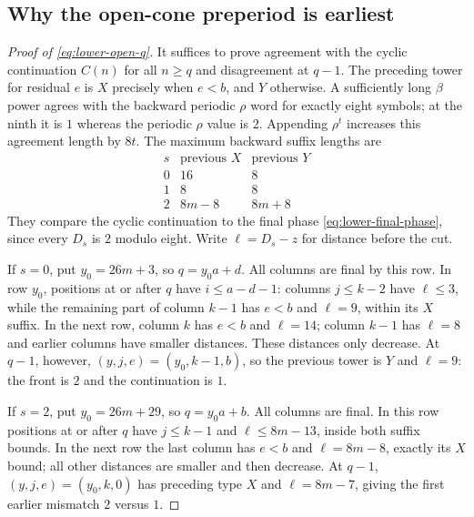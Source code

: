 \documentclass[11pt]{article}
\theoremstyle{remark}\newtheorem{remark}[theorem]{Remark}
\begin{document}
\subsection{Why the open-cone preperiod is earliest}
\begin{proof}[Proof of \eqref{eq:lower-open-q}]
It suffices to prove agreement with the cyclic continuation $C(n)$ for
all $n\ge q$ and disagreement at $q-1$. The preceding tower for residual
$e$ is $X$ precisely when $e<b$, and $Y$ otherwise.
A sufficiently long $\beta$ power agrees with the backward periodic
$\rho$ word for exactly eight symbols; at the ninth it is $1$ whereas
the periodic $\rho$ value is $2$. Appending $\rho^t$ increases this
agreement length by $8t$. The maximum backward suffix lengths are
\[
\begin{array}{c|cc}
 s&\text{previous }X&\text{previous }Y\\\hline
 0&16&8\\
 1&8&8\\
 2&8m-8&8m+8
\end{array}
\]
They compare the cyclic continuation to the final phase
\eqref{eq:lower-final-phase}, since every $D_s$ is $2$ modulo eight.
Write $\ell=D_s-z$ for distance before the cut.

If $s=0$, put $y_0=26m+3$, so $q=y_0a+d$.
All columns are final by this row. In row $y_0$, positions at or after
$q$ have $i\le a-d-1$: columns $j\le k-2$ have $\ell\le3$, while
the remaining part of column $k-1$ has $e<b$ and $\ell=9$, within its
$X$ suffix. In the next row, column $k$ has $e<b$ and $\ell=14$;
column $k-1$ has $\ell=8$ and earlier columns have smaller distances.
These distances only decrease. At $q-1$, however,
$(y,j,e)=(y_0,k-1,b)$, so the previous tower is $Y$ and $\ell=9$:
the front is $2$ and the continuation is $1$.

If $s=2$, put $y_0=26m+29$, so $q=y_0a+b$.
All columns are final. In this row positions at or after $q$ have
$j\le k-1$ and $\ell\le8m-13$, inside both suffix bounds.
In the next row the last column has $e<b$ and $\ell=8m-8$, exactly
its $X$ bound; all other distances are smaller and then decrease.
At $q-1$, $(y,j,e)=(y_0,k,0)$ has preceding type $X$ and
$\ell=8m-7$, giving the first earlier mismatch $2$ versus $1$.


\end{proof}
\end{document}
